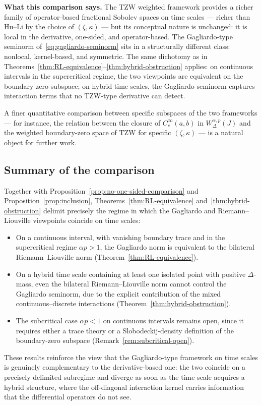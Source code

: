\documentclass[11pt,a4paper]{article}
\numberwithin{equation}{section}
\theoremstyle{definition}
\begin{document}
\medskip

\textbf{What this comparison says.} The TZW weighted framework
provides a richer family of operator-based fractional Sobolev spaces
on time scales --- richer than Hu--Li by the choice of $(\zeta,\kappa)$ ---
but its conceptual nature is unchanged: it is local in the derivative,
one-sided, and operator-based. The Gagliardo-type seminorm
of~\eqref{eq:gagliardo-seminorm} sits in a structurally different class:
nonlocal, kernel-based, and symmetric. The same dichotomy as in
Theorems~\ref{thm:RL-equivalence}--\ref{thm:hybrid-obstruction} applies:
on continuous intervals in the supercritical regime, the two
viewpoints are equivalent on the boundary-zero subspace; on hybrid
time scales, the Gagliardo seminorm captures interaction terms that
no TZW-type derivative can detect.

A finer quantitative comparison between specific subspaces of the
two frameworks --- for instance, the relation between
the closure of $C^\infty_c(a,b)$ in $W^{\alpha,p}_\Delta(J)$ and
the weighted boundary-zero space of TZW for specific
$(\zeta,\kappa)$ --- is a natural object for further work.

\subsection{Summary of the comparison}\label{subsec:RL-summary}

Together with Proposition~\ref{prop:no-one-sided-comparison} and
Proposition~\ref{prop:inclusion}, Theorems~\ref{thm:RL-equivalence}
and~\ref{thm:hybrid-obstruction} delimit precisely the regime in which
the Gagliardo and Riemann--Liouville viewpoints coincide on time
scales:
\begin{itemize}[leftmargin=2em]
\item On a continuous interval, with vanishing boundary trace and in
the supercritical regime $\alpha p > 1$, the Gagliardo norm is
equivalent to the bilateral Riemann--Liouville norm
(Theorem~\ref{thm:RL-equivalence}).

\item On a hybrid time scale containing at least one isolated point
with positive $\Delta$-mass, even the bilateral Riemann--Liouville
norm cannot control the Gagliardo seminorm, due to the explicit
contribution of the mixed continuous--discrete interactions
(Theorem~\ref{thm:hybrid-obstruction}).

\item The subcritical case $\alpha p < 1$ on continuous intervals
remains open, since it requires either a trace theory or a
Slobodeckij-density definition of the boundary-zero subspace
(Remark~\ref{rem:subcritical-open}).
\end{itemize}
These results reinforce the view that the Gagliardo-type framework on
time scales is genuinely complementary to the derivative-based one:
the two coincide on a precisely delimited subregime and diverge as
soon as the time scale acquires a hybrid structure, where the
off-diagonal interaction kernel carries information that the
differential operators do not see.
\end{document}
